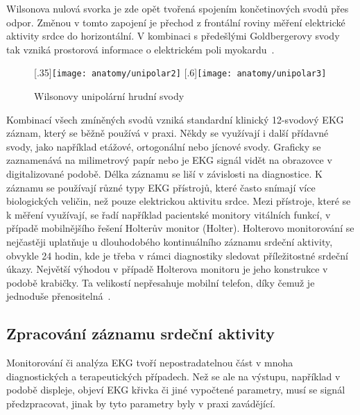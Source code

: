 \begin{enumerate}
	      Wilsonova nulová svorka je zde opět tvořená spojením končetinových
	      svodů přes odpor. Změnou v tomto zapojení je přechod z frontální
	      roviny měření elektrické aktivity srdce do horizontální. V kombinaci s
	      předešlými Goldbergerovy svody tak vzniká prostorová informace o
	      elektrickém poli myokardu~\cite{Kittnar2020}.
	      \begin{figure}[h]
		      \centering
		      [.35\linewidth]{\texttt{[image: anatomy/unipolar2]}}
		      \hfill
			      [.6\linewidth]{\texttt{[image: anatomy/unipolar3]}}
		      \caption{Wilsonovy unipolární hrudní svody}
		      \label{fig:wilson}
	      \end{figure}
\end{enumerate}

Kombinací všech zmíněných svodů vzniká standardní klinický 12-svodový EKG
záznam, který se běžně používá v praxi. Někdy se využívají i další přídavné
svody, jako například etážové, ortogonální nebo jícnové svody. Graficky se
zaznamenává na milimetrový papír nebo je EKG signál vidět na obrazovce v digitalizované
podobě. Délka záznamu se liší v závislosti na diagnostice. K záznamu se používají různé typy EKG přístrojů, které často snímají
více biologických veličin, než pouze elektrickou aktivitu srdce. Mezi přístroje,
které se k měření využívají, se řadí například pacientské monitory vitálních
funkcí, v případě mobilnějšího řešení Holterův monitor (Holter). Holterovo
monitorování se nejčastěji uplatňuje u dlouhodobého kontinuálního záznamu
srdeční aktivity, obvykle 24 hodin, kde je třeba v rámci diagnostiky sledovat
příležitostné srdeční úkazy. Největší výhodou v případě Holterova monitoru je
jeho konstrukce v podobě krabičky. Ta velikostí nepřesahuje mobilní telefon,
díky čemuž je jednoduše přenositelná~\cite{Surawicz2008}.

\subsection{Zpracování záznamu srdeční aktivity}
\label{section:ecg_processing_theory}
Monitorování či analýza EKG tvoří nepostradatelnou část v mnoha diagnostických a
terapeutických případech. Než se ale na výstupu, například v podobě displeje,
objeví EKG křivka či jiné vypočtené parametry, musí se signál
předzpracovat, jinak by tyto parametry byly v praxi zavádějící.

